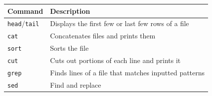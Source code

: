 \documentclass[]{book}
\begin{document}
\begin{longtable}[]{@{}ll@{}}
\toprule
\begin{minipage}[b]{0.41\columnwidth}\raggedright
Command\strut
\end{minipage} & \begin{minipage}[b]{0.53\columnwidth}\raggedright
Description\strut
\end{minipage}\tabularnewline
\midrule
\endhead
\begin{minipage}[t]{0.41\columnwidth}\raggedright
\texttt{head}/\texttt{tail}\strut
\end{minipage} & \begin{minipage}[t]{0.53\columnwidth}\raggedright
Displays the first few or last few rows of a file\strut
\end{minipage}\tabularnewline
\begin{minipage}[t]{0.41\columnwidth}\raggedright
\texttt{cat}\strut
\end{minipage} & \begin{minipage}[t]{0.53\columnwidth}\raggedright
Concatenates files and prints them\strut
\end{minipage}\tabularnewline
\begin{minipage}[t]{0.41\columnwidth}\raggedright
\texttt{sort}\strut
\end{minipage} & \begin{minipage}[t]{0.53\columnwidth}\raggedright
Sorts the file\strut
\end{minipage}\tabularnewline
\begin{minipage}[t]{0.41\columnwidth}\raggedright
\texttt{cut}\strut
\end{minipage} & \begin{minipage}[t]{0.53\columnwidth}\raggedright
Cuts out portions of each line and prints it\strut
\end{minipage}\tabularnewline
\begin{minipage}[t]{0.41\columnwidth}\raggedright
\texttt{grep}\strut
\end{minipage} & \begin{minipage}[t]{0.53\columnwidth}\raggedright
Finds lines of a file that matches inputted patterns\strut
\end{minipage}\tabularnewline
\begin{minipage}[t]{0.41\columnwidth}\raggedright
\texttt{sed}\strut
\end{minipage} & \begin{minipage}[t]{0.53\columnwidth}\raggedright
Find and replace\strut
\end{minipage}\tabularnewline

\end{longtable}
\end{document}
